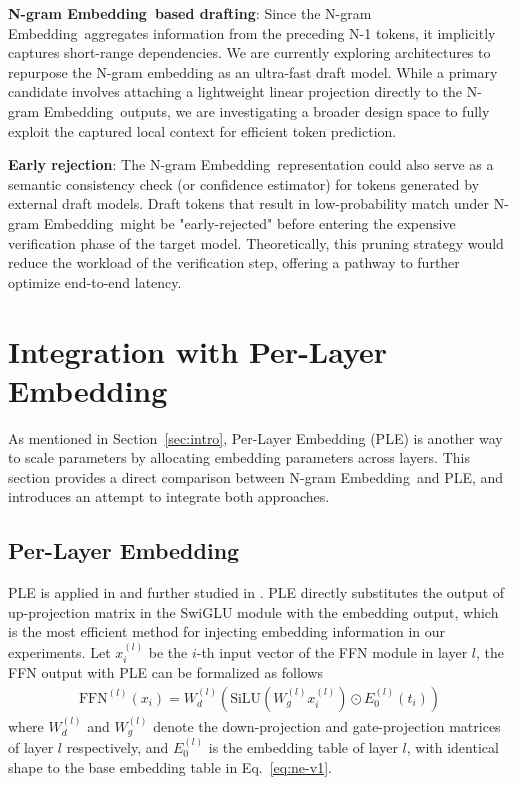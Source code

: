 \documentclass{article}
\newcommand{\method}{N-gram Embedding}
\begin{document}
\textbf{\method\ based drafting}: Since the \method\ aggregates information from the preceding N-1 tokens, it implicitly captures short-range dependencies. We are currently exploring architectures to repurpose the N-gram embedding as an ultra-fast draft model. While a primary candidate involves attaching a lightweight linear projection directly to the \method\ outputs, we are investigating a broader design space to fully exploit the captured local context for efficient token prediction.

\textbf{Early rejection}: The \method\ representation could also serve as a semantic consistency check (or confidence estimator) for tokens generated by external draft models. Draft tokens that result in low-probability match under \method\ might be "early-rejected" before entering the expensive verification phase of the target model. Theoretically, this pruning strategy would reduce the workload of the verification step, offering a pathway to further optimize end-to-end latency.

\section{Integration with Per-Layer Embedding}
As mentioned in Section~\ref{sec:intro}, Per-Layer Embedding (PLE) is another way to scale parameters by allocating embedding parameters across layers. This section provides a direct comparison between \method\ and PLE, and introduces an attempt to integrate both approaches.

\subsection{Per-Layer Embedding}
PLE is applied in \cite{gemma3n-doc} and further studied in \cite{STEM}. PLE directly substitutes the output of up-projection matrix in the SwiGLU module with the embedding output, which is the most efficient method for injecting embedding information in our experiments. Let $x^{(l)}_i$ be the $i$-th input vector of the FFN module in layer $l$, the FFN output with PLE can be formalized as follows
\begin{equation}
    \begin{aligned}
        \text{FFN}^{(l)}(x_i) = W_d^{(l)}(\text{SiLU}(W^{(l)}_gx^{(l)}_i) \odot E_0^{(l)}(t_i))
    \end{aligned}
\end{equation}
where $W_d^{(l)}$ and $W^{(l)}_g$ denote the down-projection and gate-projection matrices of layer $l$ respectively, and $E_0^{(l)}$ is the embedding table of layer $l$, with identical shape to the base embedding table in Eq.~\ref{eq:ne-v1}.
\end{document}
